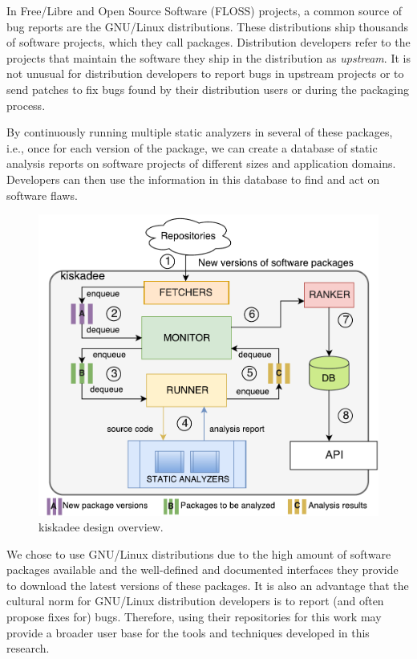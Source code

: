 In Free/Libre and Open Source Software (FLOSS) projects, a common source of bug reports are the GNU/Linux
distributions. These distributions ship thousands of software projects, which
they call packages. Distribution developers refer to the projects that maintain
the software they ship in the distribution as \textit{upstream}.  It is not
unusual for distribution developers to report bugs in upstream projects or to
send patches to fix bugs found by their distribution users or during the
packaging process.

By continuously running multiple static analyzers in several of these packages,
i.e., once for each version of the package, we can create a database of static
analysis reports on software projects of different sizes and application
domains. Developers can then use the information in this database to find and
act on software flaws.

\begin{figure}[hbt]
\centering
\includegraphics[width=.7\textwidth]{figures/kiskadee-overview.pdf}
  \caption{kiskadee design overview.}\label{fig:kiskadee:overview}
\end{figure}

We chose to use GNU/Linux distributions due to the high amount of software
packages available and the well-defined and documented interfaces they provide
to download the latest versions of these packages. It is also an advantage that
the cultural norm for GNU/Linux distribution developers is to report (and often
propose fixes for) bugs. Therefore, using their repositories for this work may
provide a broader user base for the tools and techniques developed in this
research.

